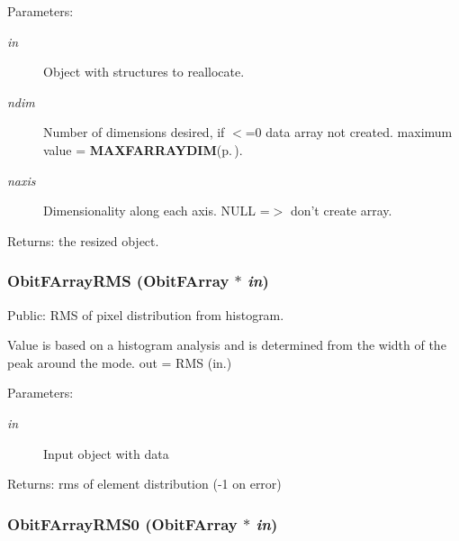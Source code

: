 \begin{Desc}
\item[Parameters:]
\begin{description}
\item[{\em in}]Object with structures to reallocate. \item[{\em ndim}]Number of dimensions desired, if $<$=0 data array not created. maximum value = {\bf MAXFARRAYDIM}{\rm (p.\,\pageref{ObitFArray_8h_a3})}. \item[{\em naxis}]Dimensionality along each axis. NULL =$>$ don't create array. \end{description}
\end{Desc}
\begin{Desc}
\item[Returns:]the resized object. \end{Desc}
\subsubsection{ Obit\-FArray\-RMS ({\bf Obit\-FArray} $\ast$ {\em in})}\label{ObitFArray_8h_a69}


Public: RMS of pixel distribution from histogram. 

Value is based on a histogram analysis and is determined from the width of the peak around the mode. out = RMS (in.) \begin{Desc}
\item[Parameters:]
\begin{description}
\item[{\em in}]Input object with data \end{description}
\end{Desc}
\begin{Desc}
\item[Returns:]rms of element distribution (-1 on error) \end{Desc}
\subsubsection{ Obit\-FArray\-RMS0 ({\bf Obit\-FArray} $\ast$ {\em in})}\label{ObitFArray_8h_a71}


